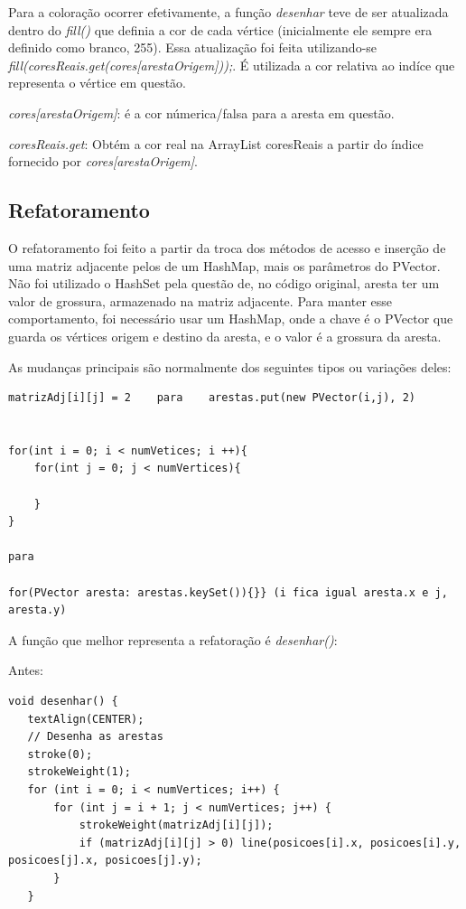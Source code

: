 \documentclass[
	12pt,				%
	oneside,			%
	a4paper,			%
	english,			%
	brazil,				%
	]{abntex2}
\begin{document}
{Para a coloração ocorrer efetivamente, a função \textit{desenhar} teve de ser atualizada dentro do \textit{fill()} que definia a cor de cada vértice (inicialmente ele sempre era definido como branco, 255). Essa atualização foi feita utilizando-se \textit{fill(coresReais.get(cores[arestaOrigem]));}. É utilizada a cor relativa ao indíce que representa o vértice em questão. 

\textit{cores[arestaOrigem]}: é a cor númerica/falsa para a aresta em questão.

\textit{coresReais.get}: Obtém a cor real na ArrayList coresReais a partir do índice fornecido por \textit{cores[arestaOrigem]}.

\subsection{Refatoramento}

O refatoramento foi feito a partir da troca dos métodos de acesso e inserção de uma matriz adjacente pelos de um HashMap, mais os parâmetros do PVector. Não foi utilizado o HashSet pela questão de, no código original, aresta ter um valor de grossura, armazenado na matriz adjacente. Para manter esse comportamento, foi necessário usar um HashMap, onde a chave é o PVector que guarda os vértices origem e destino da aresta, e o valor é a grossura da aresta.

As mudanças principais são normalmente dos seguintes tipos ou variações deles:
\begin{verbatim}
matrizAdj[i][j] = 2    para    arestas.put(new PVector(i,j), 2)


for(int i = 0; i < numVetices; i ++){
    for(int j = 0; j < numVertices){
    
    }
}   

para

for(PVector aresta: arestas.keySet()){}} (i fica igual aresta.x e j, aresta.y)
\end{verbatim}

A função que melhor representa a refatoração é \textit{desenhar()}:

Antes:


\begin{verbatim}
void desenhar() {
   textAlign(CENTER);
   // Desenha as arestas
   stroke(0);
   strokeWeight(1);
   for (int i = 0; i < numVertices; i++) {
       for (int j = i + 1; j < numVertices; j++) {
           strokeWeight(matrizAdj[i][j]);
           if (matrizAdj[i][j] > 0) line(posicoes[i].x, posicoes[i].y, posicoes[j].x, posicoes[j].y);
       }
   }


\end{verbatim}}
\end{document}
